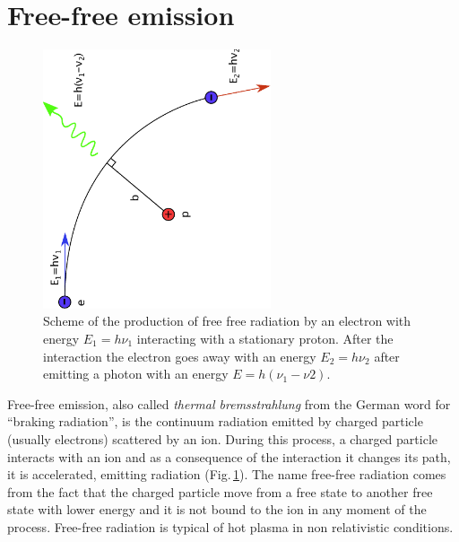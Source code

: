 \documentclass[../main.tex]{subfiles}
\begin{document}
\section{Free-free emission}

\begin{figure}
\centering
\includegraphics[width=0.6\textwidth, angle =270]{PhD_thesis/images/free_free.pdf} 
\caption[]{Scheme of the production of free free radiation by an electron with energy $E_1 = h\nu_1$ interacting with a stationary proton. After the interaction the electron goes away with an energy $E_2=h\nu_2$ after emitting a photon with an energy $E=h(\nu_1-\nu2)$.}
\label{fig:free_free}
\end{figure}

Free-free emission, also called \emph{thermal bremsstrahlung} from the German word for ``braking radiation'', is the continuum radiation emitted by charged particle (usually electrons) scattered by an ion.
During this process, a charged particle interacts with an ion and as a consequence of the interaction it changes its path, it is accelerated, emitting radiation (Fig.\,\ref{fig:free_free}).
The name free-free radiation comes from the fact that the charged particle move from a free state to another free state with lower energy and it is not bound to the ion in any moment of the process.
Free-free radiation is typical of hot plasma in non relativistic conditions.
\end{document}
